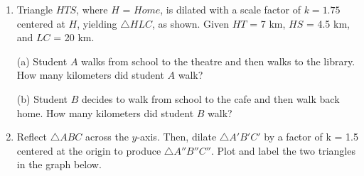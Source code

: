 \begin{enumerate}
\newpage
\item Triangle $HTS$, where $H$ = $Home$, is dilated with a scale factor of $k=1.75$ centered at $H$, yielding $\triangle HLC$, as shown. Given $HT$ = 7 km, $HS$ = 4.5 km, and $LC$ = 20 km.

(a) Student $A$ walks from school to the theatre and then walks to the library. How many kilometers did student $A$ walk?

(b) Student $B$ decides to walk from school to the cafe and then walk back home. How many kilometers did student $B$ walk?

\begin{flushright}
\end{flushright} \vspace{0.5cm}

\item Reflect $\triangle ABC$ across the $y$-axis. Then, dilate $\triangle A'B'C'$ by a factor of k = 1.5 centered at the origin to produce $\triangle A''B''C''$. Plot and label the two triangles in the graph below.
\begin{center}
\end{center}

\end{enumerate}

